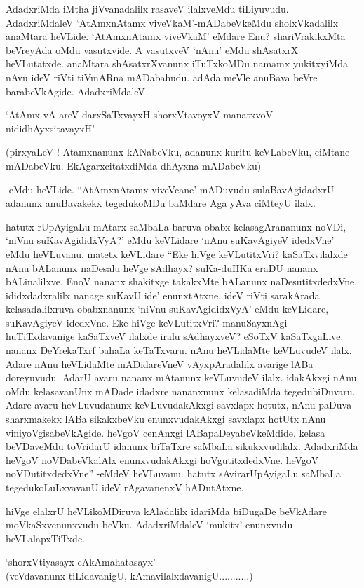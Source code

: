 AdadxriMda iMtha jiVvanadalilx rasaveV ilalxveMdu tiLiyuvudu. AdadxriMdaleV `AtAmxnAtamx viveVkaM'-mADabeVkeMdu sholxVkadalilx anaMtara heVLide. `AtAmxnAtamx viveVkaM' eMdare Enu? shariVrakikxMta beVreyAda oMdu vasutxvide. A vasutxveV `nAnu' eMdu shAsatxrX heVLutatxde. anaMtara shAsatxrXvanunx iTuTxkoMDu namamx yukitxyiMda nAvu ideV riVti tiVmARna mADabahudu. adAda meVle anuBava beVre barabeVkAgide. AdadxriMdaleV-

\begin{shloka}
`AtAmx vA areV darxSaTxvayxH shorxVtavoyxV manatxvoV nididhAyxsitavayxH'
\end{shloka}

(pirxyaLeV ! Atamxnanunx kANabeVku, adanunx kuritu keVLabeVku, ciMtane mADabeVku. EkAgarxcitatxdiMda dhAyxna mADabeVku)

-eMdu heVLide. ``AtAmxnAtamx viveVcane' mADuvudu sulaBavAgidadxrU adanunx anuBavakekx tegedukoMDu baMdare Aga yAva ciMteyU ilalx.

hatutx rUpAyigaLu mAtarx saMbaLa baruva obabx kelasagArananunx noVDi, `niVnu suKavAgididxVyA?' eMdu keVLidare `nAnu suKavAgiyeV idedxVne' eMdu heVLuvanu. matetx keVLidare ``Eke hiVge keVLutitxVri? kaSaTxvilalxde nAnu bALanunx naDesalu heVge sAdhayx? suKa-duHKa eraDU nananx bALinalilxve. EnoV nananx shakitxge takakxMte bALanunx naDesutitxdedxVne. ididxdadxralilx nanage suKavU ide' enunxtAtxne. ideV riVti sarakArada kelasadalilxruva obabxnanunx `niVnu suKavAgididxVyA' eMdu keVLidare, suKavAgiyeV idedxVne. Eke hiVge keVLutitxVri? manuSayxnAgi huTiTxdavanige kaSaTxveV ilalxde iralu sAdhayxveV? eSoTxV kaSaTxgaLive. nananx DeYrekaTxrf bahaLa keTaTxvaru. nAnu heVLidaMte keVLuvudeV ilalx. Adare nAnu heVLidaMte mADidareVneV vAyxpAradalilx avarige lABa doreyuvudu. AdarU avaru nananx mAtanunx keVLuvudeV ilalx. idakAkxgi nAnu oMdu kelasavanUnx mADade idadxre nananxnunx kelasadiMda tegedubiDuvaru. Adare avaru heVLuvudanunx keVLuvudakAkxgi savxlapx hotutx, nAnu paDuva sharxmakekx lABa sikakxbeVku enunxvudakAkxgi savxlapx hotUtx nAnu viniyoVgisabeVkAgide. heVgoV cenAnxgi lABapaDeyabeVkeMdide. kelasa beVDaveMdu toVridarU idanunx biTaTxre saMbaLa sikukxvudilalx. AdadxriMda heVgoV noVDabeVkalAlx enunxvudakAkxgi hoVgutitxdedxVne. heVgoV noVDutitxdedxVne'' -eMdeV heVLuvanu. hatutx sAvirarUpAyigaLu saMbaLa tegedukoLuLxvavanU ideV rAgavanenxV hADutAtxne.

hiVge elalxrU heVLikoMDiruva kAladalilx idariMda biDugaDe beVkAdare moVkaSxvenunxvudu beVku. AdadxriMdaleV `mukitx' enunxvudu heVLalapxTiTxde.

\begin{shloka}
`shorxVtiyasayx cAkAmahatasayx'\\
(veVdavanunx tiLidavanigU, kAmavilalxdavanigU...........)
\end{shloka}

